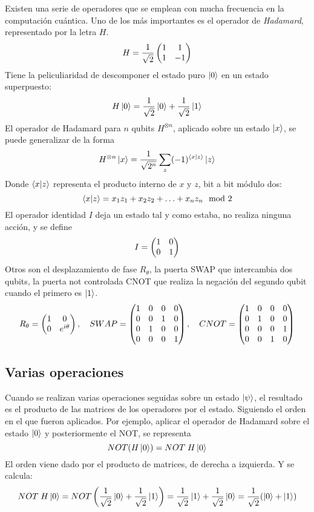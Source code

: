 Existen una serie de operadores que se emplean con mucha frecuencia en la 
computación cuántica. Uno de los más importantes es el operador de 
\textit{Hadamard}, representado por la letra $H$.
%
$$ H = \frac{1}{\sqrt 2} \begin{pmatrix} 1 & 1 \\ 1 & -1 \end{pmatrix} $$
%
Tiene la peliculiaridad de descomponer el estado puro $\ket{0}$ en un estado 
superpuesto:
%
$$ H \ket{0} = \frac{1}{\sqrt 2}\ket{0} + \frac{1}{\sqrt 2}\ket{1} $$
%
El operador de Hadamard para $n$ qubits $H^{\otimes n}$, aplicado sobre un 
estado $\ket{x}$, se puede generalizar de la forma
%
$$ H^{\otimes n} \ket{x} = \frac 1 {\sqrt {2^n}} \sum_z (-1)^{\braket{x|z}} 
\ket{z}$$
%
Donde $\braket{x|z}$ representa el producto interno de $x$ y $z$, bit a bit 
módulo dos:
%
$$ \braket{x|z} = x_1 z_1 + x_2 z_2 + \ldots + x_n z_n \mod 2$$
%
El operador identidad $I$ deja un estado tal y como estaba, no realiza ninguna 
acción, y se define
%
$$ I = \begin{pmatrix} 1&0 \\ 0&1 \end{pmatrix}$$
%
Otros son el desplazamiento de fase $R_\theta$, la puerta SWAP que intercambia 
dos qubits, la puerta not controlada CNOT que realiza la negación del segundo 
qubit cuando el primero es $\ket{1}$.
$$ R_\theta = \begin{pmatrix} 1 & 0 \\ 0 & e^{i\theta} \end{pmatrix}, \quad
SWAP = \begin{pmatrix} 1&0&0&0 \\ 0&0&1&0 \\ 0&1&0&0 \\ 0&0&0&1 \end{pmatrix}, \quad
CNOT = \begin{pmatrix} 1&0&0&0 \\ 0&1&0&0 \\ 0&0&0&1 \\ 0&0&1&0 \end{pmatrix}
$$


\subsection{Varias operaciones}

Cuando se realizan varias operaciones seguidas sobre un estado $\ket{\psi}$, el 
resultado es el producto de las matrices de los operadores por el estado.  
Siguiendo el orden en el que fueron aplicados. Por ejemplo, aplicar el operador 
de Hadamard sobre el estado $\ket{0}$ y posteriormente el NOT, se representa
%
$$ NOT(H\ket{0}) = NOT\; H \ket{0} $$
%
El orden viene dado por el producto de matrices, de derecha a izquierda. Y se 
calcula:
%
$$ NOT\; H \ket{0} = NOT\left(\frac{1}{\sqrt 2}\ket{0} + \frac{1}{\sqrt 
2}\ket{1}\right) =
\frac{1}{\sqrt 2}\ket{1} + \frac{1}{\sqrt 2}\ket{0} = \frac{1}{\sqrt 2}(\ket{0} 
+ \ket{1}) $$


